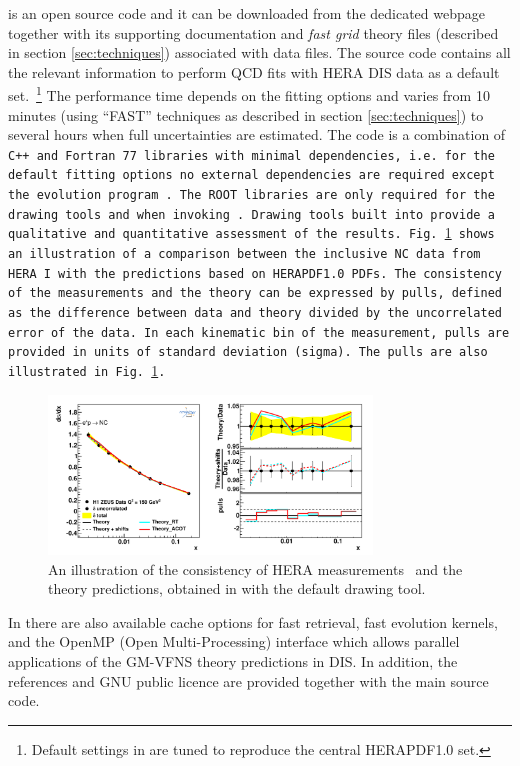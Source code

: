 
\fitter is an open source code and it can be downloaded from the dedicated webpage \cite{herafitter:page}
together with its supporting documentation and 
\emph{fast grid} theory files (described in section \ref{sec:techniques}) associated with data files.
The source code contains all the relevant information to perform QCD fits with HERA DIS data as a default 
set.~\footnote{Default settings in \fitter are tuned to reproduce the central HERAPDF1.0 set.} 
The performance time depends on the fitting options and varies from 10 minutes 
(using ``FAST'' techniques as described in section \ref{sec:techniques}) to several hours when 
full uncertainties are estimated. The \fitter code is a combination of \tt C++ \rm and \tt Fortran 77\rm \ libraries with minimal 
dependencies, i.e. for the default fitting options no external dependencies are required except the \qcdnum evolution program \cite{qcdnum}.
The \tt ROOT \rm  libraries are only required for the drawing tools and when invoking \applgrid.  
Drawing tools built into \fitter provide a qualitative and quantitative assessment of the results.
Fig.~\ref{fig:data} shows an illustration of a comparison between the inclusive NC data from HERA I
with the predictions based on HERAPDF1.0 PDFs.
The consistency of the measurements and the theory can be expressed by pulls, defined as the difference between data and theory divided by the uncorrelated error of the data. 
In each kinematic bin of the measurement, pulls are provided in units of standard deviation (sigma).  
The pulls are also illustrated in Fig.~\ref{fig:data}.
\begin{figure}[!ht]
   \centering
   \includegraphics[width=8.6cm]{datatheory.pdf}
   \caption{An illustration of the consistency of HERA measurements~\cite{h1zeus:2009wt} and the theory predictions, 
       obtained in \fitter with the default drawing tool.} 
 \label{fig:data}
\end{figure}


In \fitter there are also available cache options for fast retrieval, fast evolution kernels, and the OpenMP (Open Multi-Processing) 
interface which allows parallel applications of the GM-VFNS theory predictions in DIS. 
In addition, the \fitter references and GNU public licence are provided 
together with the main source code. 


